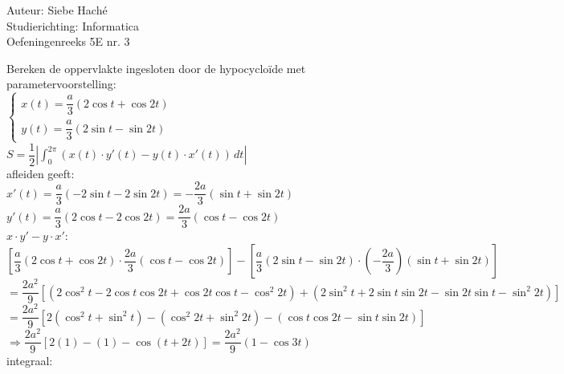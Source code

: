 \documentclass[a4paper]{article}
\begin{document}
\noindent \large Auteur: Siebe Haché \\
\noindent \large Studierichting: Informatica \\
\noindent \large Oefeningenreeks 5E nr. 3 \\

\medskip
\normalsize

Bereken de oppervlakte ingesloten door de hypocycloïde met parametervoorstelling:\\

$\left\{ \begin{array}{l} 
    x(t) = \dfrac{a}{3}(2 \cos t + \cos 2t)\\
    
    y(t) = \dfrac{a}{3}(2 \sin t - \sin2t) 
    
\end{array} \right. $\\

$S = \dfrac{1}{2} \left| \displaystyle\int_{0}^{2\pi} (x(t) \cdot y'(t) - y(t) \cdot x'(t)) \, dt \right|$\\

afleiden geeft:\\

$x'(t) = \dfrac{a}{3}(-2 \sin t - 2 \sin 2t) = -\dfrac{2a}{3}(\sin t + \sin 2t)$\\

$y'(t) = \dfrac{a}{3}(2 \cos t - 2 \cos 2t) = \dfrac{2a}{3}(\cos t - \cos 2t)$\\

$x \cdot y' - y \cdot x'$:\\

$\left[ \dfrac{a}{3}(2\cos t + \cos 2t) \cdot \dfrac{2a}{3}(\cos t - \cos 2t) \right] - \left[ \dfrac{a}{3}(2\sin t - \sin 2t) \cdot \left(-\dfrac{2a}{3}\right)(\sin t + \sin 2t) \right]$\\

$= \dfrac{2a^2}{9} \left[ (2\cos^2 t - 2\cos t \cos 2t + \cos 2t \cos t - \cos^2 2t) + (2\sin^2 t + 2\sin t \sin 2t - \sin 2t \sin t - \sin^2 2t) \right]$\\

$= \dfrac{2a^2}{9} \left[ 2(\cos^2 t + \sin^2 t) - (\cos^2 2t + \sin^2 2t) - (\cos t \cos 2t - \sin t \sin 2t) \right]$\\

$\Rightarrow \dfrac{2a^2}{9} \left[ 2(1) - (1) - \cos(t + 2t) \right] = \dfrac{2a^2}{9} (1 - \cos 3t)$\\

integraal: \\
\end{document}

